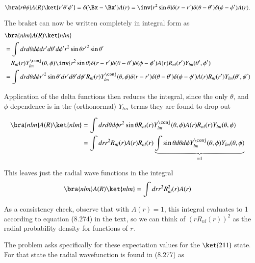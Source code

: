 \begin{equation}\label{eqn:qmIproblemSet4:206}
\bra{ r \theta \phi} A(R) \ket{ r' \theta' \phi'} = \\
\delta(\Bx - \Bx') A(r) = \inv{r^2 \sin\theta} \delta(r-r') \delta(\theta -\theta')\delta(\phi-\phi') A(r).
\end{equation}

The braket can now be written completely in integral form as
\begin{align*}
&\bra{nlm} A(R) \ket{nlm} \\
&=
\int 
dr d\theta d\phi 
dr' d\theta' d\phi'
r^2 \sin\theta 
{r'}^2 \sin\theta'  \\
&\quad R_{nl}(r) Y_{lm}^\conj(\theta, \phi)
\inv{r^2 \sin\theta} \delta(r-r') \delta(\theta -\theta')\delta(\phi-\phi') A(r)
R_{nl}(r') Y_{lm}(\theta', \phi') \\
&=
\int 
dr d\theta d\phi 
{r'}^2 \sin\theta' dr' d\theta' d\phi'
R_{nl}(r) Y_{lm}^\conj(\theta, \phi)
\delta(r-r') \delta(\theta -\theta')\delta(\phi-\phi') A(r)
R_{nl}(r') Y_{lm}(\theta', \phi') \\
\end{align*}

Application of the delta functions then reduces the integral, since the only $\theta$, and $\phi$ dependence is in the (orthonormal) $Y_{lm}$ terms they are found to drop out

\begin{align*}
\bra{nlm} A(R) \ket{nlm}
&=
\int 
dr d\theta d\phi 
r^2 \sin\theta 
R_{nl}(r) Y_{lm}^\conj(\theta, \phi)
A(r)
R_{nl}(r) Y_{lm}(\theta, \phi) \\
&=
\int 
dr 
r^2 
R_{nl}(r) 
A(r)
R_{nl}(r) 
\underbrace{\int
\sin\theta d\theta d\phi 
Y_{lm}^\conj(\theta, \phi)
Y_{lm}(\theta, \phi) }_{=1}
\\
\end{align*}

This leaves just the radial wave functions in the integral
\begin{equation}\label{eqn:qmIproblemSet4:208}
\bra{nlm} A(R) \ket{nlm}
=
\int 
dr 
r^2 
R_{nl}^2(r) 
A(r)
\end{equation}

As a consistency check, observe that with $A(r) = 1$, this integral evaluates to 1 according to equation (8.274) in the text, so we can think of $(r R_{nl}(r))^2$ as the radial probability density for functions of $r$.

The problem asks specifically for these expectation values for the $\ket{211}$ state.  For that state the radial wavefunction is found in (8.277) as

